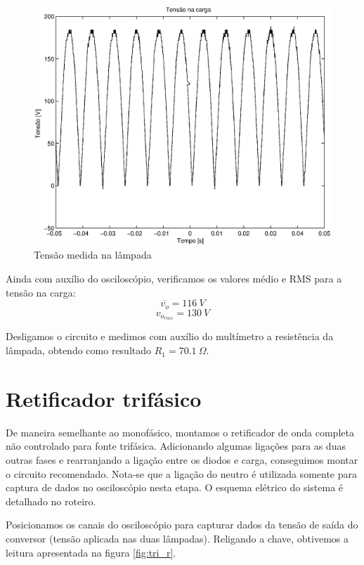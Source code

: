 \documentclass{report}
\begin{document}
\begin{figure}[H]
	\centering
	\includegraphics[width=\linewidth]{dados/monofasico/mono_r}
	\caption{Tensão medida na lâmpada}
	\label{fig:mono_r}
\end{figure}

Ainda com auxílio do osciloscópio, verificamos os valores médio e RMS para a tensão na carga:
\begin{equation}
\overline{v_o} = 116\ V
\end{equation}
\begin{equation}
v_{o_{rms}} = 130\ V
\end{equation}

Desligamos o circuito e medimos com auxílio do multímetro a resistência da lâmpada, obtendo como resultado $R_1=70.1\ \Omega$.


\section{Retificador trifásico}
De maneira semelhante ao monofásico, montamos o retificador de onda completa não controlado para fonte trifásica. Adicionando algumas ligações para as duas outras fases e rearranjando a ligação entre os diodos e carga, conseguimos montar o circuito recomendado. Nota-se que a ligação do neutro é utilizada somente para captura de dados no osciloscópio nesta etapa. O esquema elétrico do sistema é detalhado no roteiro.

Posicionamos os canais do osciloscópio para capturar dados da tensão de saída do conversor (tensão aplicada nas duas lâmpadas). Religando a chave, obtivemos a leitura apresentada na figura \ref{fig:tri_r}. 
\end{document}
